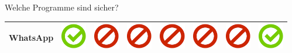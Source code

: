 \documentclass[final]{beamer}
\newlength{\sepwid}
\newlength{\twocolwid}
\begin{document}
\begin{frame}[t]
\begin{columns}[t, totalwidth=\textwidth]
\begin{column}{\twocolwid}
\begin{block}{Welche Programme sind sicher?}
\begin{tabular}{ l | C{4cm} | C{4.5cm} | C{4cm} | C{4.5cm} | C{4cm} | C{5cm} | C{3cm} | }
WhatsApp & \includegraphics[scale=0.5]{pics/haken.png} & \includegraphics[scale=0.5]{pics/nohaken.png} & \includegraphics[scale=0.5]{pics/nohaken.png} & \includegraphics[scale=0.5]{pics/nohaken.png} & \includegraphics[scale=0.5]{pics/nohaken.png} & \includegraphics[scale=0.5]{pics/nohaken.png} & \includegraphics[scale=0.5]{pics/haken.png} \tabularnewline
\hline
\end{tabular}

\end{block}

\end{column} %

\begin{column}{\sepwid}\end{column} %

\end{columns} %


\end{frame} %
\end{document}
